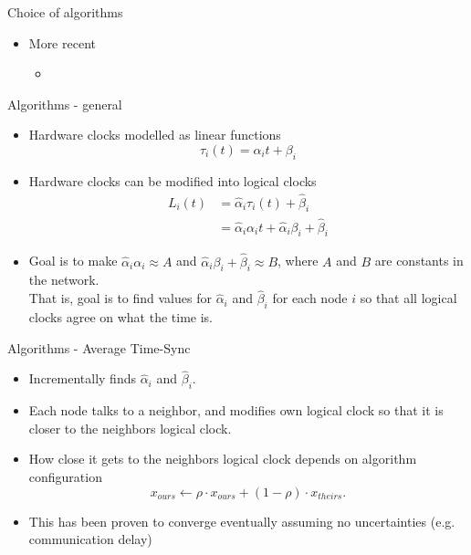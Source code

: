 \documentclass{beamer}
\begin{document}
\begin{frame}{Choice of algorithms}
    \begin{itemize}
        \item More recent
        \begin{itemize}
            \item 
        \end{itemize}
    \end{itemize}
\end{frame}
 
\begin{frame}{Algorithms - general}
    \begin{itemize}
        \item Hardware clocks modelled as linear functions $$ \tau_i(t) = \alpha_i t + \beta_i $$
        \item Hardware clocks can be modified into logical clocks
        \begin{align*}
            L_i(t) &= \hat{\alpha}_i \tau_i(t) + \hat{\beta}_i \\
                    &= \hat{\alpha}_i \alpha_i t + \hat{\alpha}_i \beta_i + \hat{\beta}_i
        \end{align*}
        \item Goal is to make $\hat{\alpha}_i \alpha_i \approx A$ and $\hat{\alpha}_i \beta_i + \hat{\beta}_i \approx B$, where $A$ and $B$ are constants in the network.\\
        That is, goal is to find values for $\hat{\alpha}_i$ and $\hat{\beta}_i$ for each node $i$ so that all logical clocks agree on what the time is.
    \end{itemize}
\end{frame}

\begin{frame}{Algorithms - Average Time-Sync}
    \begin{itemize}
        \item Incrementally finds $\hat{\alpha}_i$ and $\hat{\beta}_i$.
        \item Each node talks to a neighbor, and modifies own logical clock so that it is closer to the neighbors logical clock.
        \item How close it gets to the neighbors logical clock depends on algorithm configuration
        $$ x_{ours} \leftarrow \rho \cdot x_{ours} + (1 - \rho) \cdot x_{theirs}. $$
        \item This has been proven to converge eventually assuming no uncertainties (e.g. communication delay) \cite{LucaFiorentin11}
    \end{itemize}
\end{frame}
\end{document}
